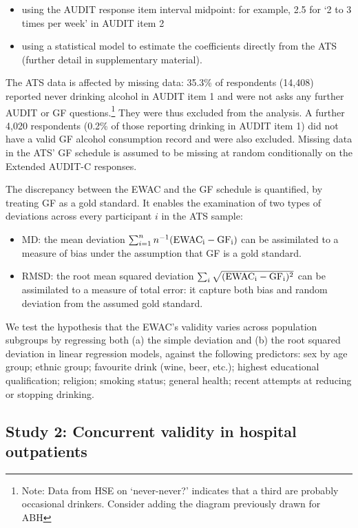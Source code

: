 \documentclass[]{article}
\providecommand{\tightlist}{%
  \setlength{\itemsep}{0pt}\setlength{\parskip}{0pt}}
\let\rmarkdownfootnote\footnote%
\def\footnote{\protect\rmarkdownfootnote}
\begin{document}
\begin{itemize}
\tightlist
\item
  using the AUDIT response item interval midpoint: for example, 2.5 for
  `2 to 3 times per week' in AUDIT item 2
\item
  using a statistical model to estimate the coefficients directly from
  the ATS (further detail in supplementary material).
\end{itemize}

The ATS data is affected by missing data: 35.3\% of respondents (14,408)
reported never drinking alcohol in AUDIT item 1 and were not asks any
further AUDIT or GF questions.\footnote{Note: Data from HSE on
  `never-never?' indicates that a third are probably occasional
  drinkers. Consider adding the diagram previously drawn for ABH} They
were thus excluded from the analysis. A further 4,020 respondents (0.2\%
of those reporting drinking in AUDIT item 1) did not have a valid GF
alcohol consumption record and were also excluded. Missing data in the
ATS' GF schedule is assumed to be missing at random conditionally on the
Extended AUDIT-C responses.

The discrepancy between the EWAC and the GF schedule is quantified, by
treating GF as a gold standard. It enables the examination of two types
of deviations across every participant \(i\) in the ATS sample:

\begin{itemize}
\tightlist
\item
  MD: the mean deviation
  \(\sum_{i=1}^{n}{n^{-1}(\rm{EWAC_i} - \rm{GF_i} )}\) can be
  assimilated to a measure of bias under the assumption that GF is a
  gold standard.
\item
  RMSD: the root mean squared deviation
  \(\sum_{i}{\sqrt{( \rm{EWAC_i} - \rm{GF_i} )^2}}\) can be assimilated
  to a measure of total error: it capture both bias and random deviation
  from the assumed gold standard.
\end{itemize}

We test the hypothesis that the EWAC's validity varies across population
subgroups by regressing both (a) the simple deviation and (b) the root
squared deviation in linear regression models, against the following
predictors: sex by age group; ethnic group; favourite drink (wine, beer,
etc.); highest educational qualification; religion; smoking status;
general health; recent attempts at reducing or stopping drinking.

\hypertarget{study-2-concurrent-validity-in-hospital-outpatients}{%
\subsection{Study 2: Concurrent validity in hospital
outpatients}\label{study-2-concurrent-validity-in-hospital-outpatients}}
\end{document}
